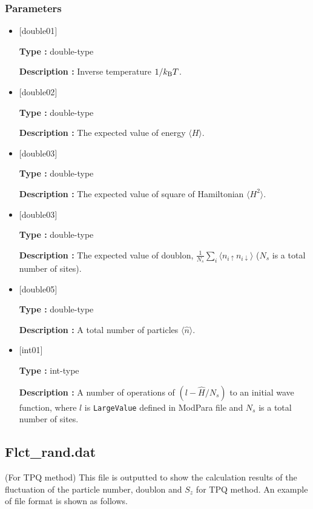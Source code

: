 \subsubsection{Parameters}
 \begin{itemize}

  \item  $[$double01$]$
  
 {\bf Type :} double-type

{\bf Description :} Inverse temperature $1/{k_{\rm B}T}$.
 
  \item $[$double02$]$

 {\bf Type :} double-type 

{\bf Description :}  The expected value of  energy $\langle H \rangle$.

  \item $[$double03$]$

 {\bf Type :} double-type 

{\bf Description :} The expected value of square of Hamiltonian $\langle H^2 \rangle$. 

  \item $[$double03$]$

 {\bf Type :} double-type 

{\bf Description :} The expected value of doublon, 
$\frac{1}{N_s} \sum_{i}\langle n_{i\uparrow}n_{i\downarrow}\rangle$ ($N_{s}$ is a total number of sites).

  \item $[$double05$]$

 {\bf Type :} double-type 

{\bf Description :} A total number of particles $\langle {\hat n} \rangle$.


  \item $[$int01$]$

 {\bf Type :} int-type 

{\bf Description :} A number of operations of $(l-\hat{H}/N_{s})$ to an initial wave function, where $l$ is \verb|LargeValue| defined in ModPara file and $N_{s}$ is a total number of sites.

 \end{itemize}

\newpage
\subsection{Flct\_rand.dat}
\label{Subsec:flctrand}
(For TPQ method) This file is outputted to show the calculation results of the fluctuation of the particle number, doublon and $S_z$ for TPQ method.
An example of file format is shown as follows.\\

